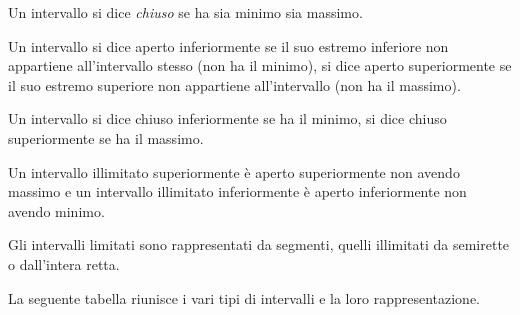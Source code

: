 \begin{newdef}{}{}
Un intervallo si dice \emph{chiuso} se  ha sia minimo sia massimo.
\end{newdef}


\begin{newdef}{}{}
Un intervallo si dice aperto inferiormente se il suo estremo inferiore non 
appartiene all'intervallo stesso (non ha il minimo), 
si dice aperto superiormente se il suo estremo superiore non appartiene 
all'intervallo (non ha il massimo).
\end{newdef}

\begin{newdef}{}{}
Un intervallo si dice chiuso inferiormente se ha il minimo, 
si dice chiuso superiormente se ha il massimo.
\end{newdef}

Un intervallo illimitato superiormente è aperto superiormente non avendo 
massimo e un intervallo illimitato inferiormente è aperto inferiormente non 
avendo minimo.

Gli intervalli limitati sono rappresentati da segmenti, quelli illimitati da 
semirette o dall'intera retta.

La seguente tabella riunisce i vari tipi di intervalli e la loro 
rappresentazione.


